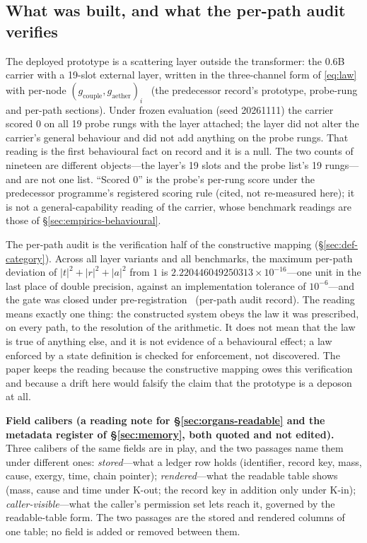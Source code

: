 \documentclass[11pt,a4paper]{article}
\newcommand{\gcouple}{g_{\mathrm{couple}}}
\newcommand{\gaether}{g_{\mathrm{aether}}}
\begin{document}
\subsection{What was built, and what the per-path audit verifies}
\label{sec:empirics-audit}

The deployed prototype is a scattering layer outside the transformer: the 0.6B carrier with a 19-slot external layer, written in the three-channel form of \eqref{eq:law} with per-node $(\gcouple,\gaether)_{i}$~\cite{deposon2026} (the predecessor record's prototype, probe-rung and per-path sections). Under frozen evaluation (seed 20261111) the carrier scored 0 on all 19 probe rungs with the layer attached; the layer did not alter the carrier's general behaviour and did not add anything on the probe rungs. That reading is the first behavioural fact on record and it is a null. The two counts of nineteen are different objects---the layer's 19 slots and the probe list's 19 rungs---and are not one list. ``Scored 0'' is the probe's per-rung score under the predecessor programme's registered scoring rule (cited, not re-measured here); it is not a general-capability reading of the carrier, whose benchmark readings are those of \S\ref{sec:empirics-behavioural}.

The per-path audit is the verification half of the constructive mapping (\S\ref{sec:def-category}). Across all layer variants and all benchmarks, the maximum per-path deviation of $\lvert t\rvert^2 + \lvert r\rvert^2 + \lvert a\rvert^2$ from $1$ is $2.220446049250313\times10^{-16}$---one unit in the last place of double precision, against an implementation tolerance of $10^{-6}$---and the gate was closed under pre-registration~\cite{deposon2026} (per-path audit record). The reading means exactly one thing: the constructed system obeys the law it was prescribed, on every path, to the resolution of the arithmetic. It does not mean that the law is true of anything else, and it is not evidence of a behavioural effect; a law enforced by a state definition is checked for enforcement, not discovered. The paper keeps the reading because the constructive mapping owes this verification and because a drift here would falsify the claim that the prototype is a deposon at all.

\textbf{Field calibers (a reading note for \S\ref{sec:organs-readable} and the metadata register of \S\ref{sec:memory}, both quoted and not edited).} Three calibers of the same fields are in play, and the two passages name them under different ones: \emph{stored}---what a ledger row holds (identifier, record key, mass, cause, exergy, time, chain pointer); \emph{rendered}---what the readable table shows (mass, cause and time under K-out; the record key in addition only under K-in); \emph{caller-visible}---what the caller's permission set lets reach it, governed by the readable-table form. The two passages are the stored and rendered columns of one table; no field is added or removed between them.
\end{document}
